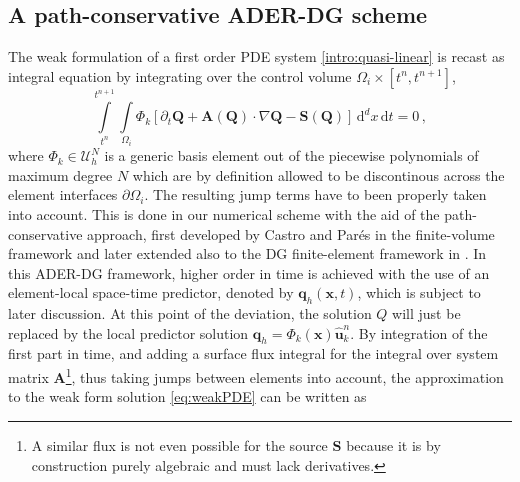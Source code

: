 
\subsection{A path-conservative ADER-DG scheme}\label{sec:holy-dg-scheme}
The weak formulation of a first order PDE system \eqref{intro:quasi-linear} is
recast as integral equation by integrating over the control volume
$\Omega_i \times [t^n, t^{n+1}]$,
%
\begin{equation}
 \int \limits_{t^n}^{t^{n+1}} \int\limits_{\Omega_i } \Phi_k \left[
  \partial_t \boldsymbol{Q} + \boldsymbol{A}(\boldsymbol{Q}) \cdot\nabla
  \boldsymbol{Q}
  -\boldsymbol S (\boldsymbol Q)
  \right] \,\mathrm d^d x\,\mathrm dt = 0\,, \label{eq:weakPDE}
\end{equation}
%
where $\Phi_k\in \mathcal{U}_h^N$ is a generic basis element out of the
piecewise polynomials of maximum degree $N$ which are by definition allowed
to be discontinous across the element interfaces $\partial \Omega_i$. The
resulting jump terms have to been properly taken into account.
This is done in our
numerical scheme with the aid of the path-conservative approach, first
developed by Castro and Par\'es in the finite-volume framework
\cite{Castro2006, Pares2006} and later extended also to the DG
finite-element framework in \cite{Rhebergen2008, Dumbser2009a,
	Dumbser2010}.
In this ADER-DG framework, higher order in time is
achieved with the use of an element-local space-time predictor, denoted
by $\boldsymbol{q}_h(\boldsymbol{x},t)$, which is subject to later discussion.
At this point of the deviation, the solution $Q$ will just be replaced by the
local predictor solution $\boldsymbol{q}_h=\Phi_k(\boldsymbol{x}) \boldsymbol{\hat u}^n_k$.
By integration of the first part in time, and adding a surface flux integral for
the integral over system matrix $\boldsymbol A$\footnote{
  A similar flux is not even possible for the source $\boldsymbol S$
  because it is by construction purely algebraic and must lack derivatives.
}, thus taking jumps between elements into account,
the approximation to the weak form solution \eqref{eq:weakPDE} can be written as
